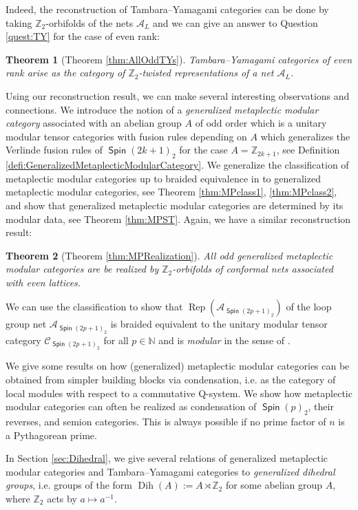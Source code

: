 \documentclass[twoside,11pt,reqno]{amsart}
\makeatletter
\newtheorem{thm}{Theorem}[section]
\theoremstyle{definition}
\theoremstyle{remark}
\newcommand{\Spin}{\mathop{\mathsf{Spin}}}
\newcommand{\C}{\mathcal{C}}
\newcommand{\A}{\mathcal{A}}
\newcommand{\ZZ}{\mathbb{Z}}
\newcommand{\NN}{\mathbb{N}}
\DeclareMathOperator{\Rep}{Rep}
\DeclareRobustCommand{\ie}{i.e.\@\xspace}
\DeclareMathOperator{\Dih}{Dih}
\newcommand{\myemph}[1]{\emph{#1}}
\makeatother
\begin{document}
Indeed, the reconstruction of Tambara--Yamagami categories can be done by taking $\ZZ_2$-orbifolds of the nets $\A_L$ and we can give an answer to 
Question \ref{quest:TY} for the case of even rank: 
\begin{thm}[Theorem \ref{thm:AllOddTYs}]
  Tambara--Yamagami categories of even rank arise as the category
  of $\ZZ_2$-twisted representations of a net $\A_L$.
\end{thm}
Using our reconstruction result, we can make several interesting observations and 
connections.
We introduce the notion of a \emph{generalized metaplectic modular category} 
associated with an abelian group $A$ of odd order which is a 
unitary modular tensor categories with fusion rules depending on $A$ 
which generalizes the Verlinde fusion rules of $\Spin(2k+1)_2$ for the case 
$A=\ZZ_{2k+1}$, see Definition \ref{defi:GeneralizedMetaplecticModularCategory}.
We generalize the classification of metaplectic modular categories 
up to braided equivalence in \cite{ArChRoWa2016} to 
generalized metaplectic modular categories, see 
  Theorem \ref{thm:MPclass1}, \ref{thm:MPclass2}, 
and show that generalized metaplectic modular categories 
are determined by its modular data, see Theorem \ref{thm:MPST}.
Again, we have a similar reconstruction result:
\begin{thm}[Theorem \ref{thm:MPRealization}]
    All odd generalized metaplectic modular categories are be realized by 
    $\ZZ_2$-orbifolds of conformal nets associated with even lattices.
\end{thm}
We can use the classification to show that $\Rep(\A_{\Spin(2p+1)_2})$ of 
the loop group net $\A_{\Spin(2p+1)_2}$ is braided equivalent
to the unitary modular tensor category $\C_{\Spin(2p+1)_2}$ for all $p\in\NN$
and is \myemph{modular} in the sense of \cite{KaLo2005}.


We give some results on how (generalized) metaplectic modular categories can be obtained from simpler building blocks via condensation, 
\ie as the category of local modules with respect to a commutative Q-system. 
We show how metaplectic modular categories can often be realized as condensation
of $\Spin(p)_2$, their reverses, and semion categories. 
This is always possible if no prime factor of $n$ is a Pythagorean prime.

In Section \ref{sec:Dihedral}, we give several relations of 
generalized metaplectic modular categories and Tambara--Yamagami categories to 
  \emph{generalized dihedral groups}, 
\ie groups of the form $\Dih(A):=A\rtimes \ZZ_2$ for some abelian group $A$, 
where $\ZZ_2$ acts by $a\mapsto a^{-1}$. 
   
\end{document}
